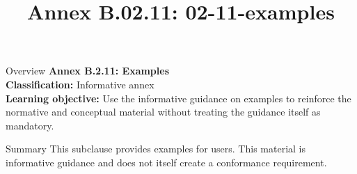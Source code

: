 \documentclass[10pt,letterpaper]{article}
\title{Annex B.02.11: 02-11-examples}
\author{}
\date{}
\begin{document}
\maketitle
\begin{CornellOverviewBox}{Overview}
{\Large\bfseries\textcolor{CNavy}{Annex B.2.11: Examples}}\\[3pt]
{\small\textbf{Classification:} Informative annex}\\
{\small\textbf{Learning objective:} Use the informative guidance on examples to reinforce the normative and conceptual material without treating the guidance itself as mandatory.}
\end{CornellOverviewBox}
\vspace{3pt}

\begin{CornellNotesTable}
\end{CornellNotesTable}


\begin{CornellSummaryBox}{Summary}
This subclause provides examples for users. This material is informative guidance and does not itself create a conformance requirement.
\end{CornellSummaryBox}
\end{document}

